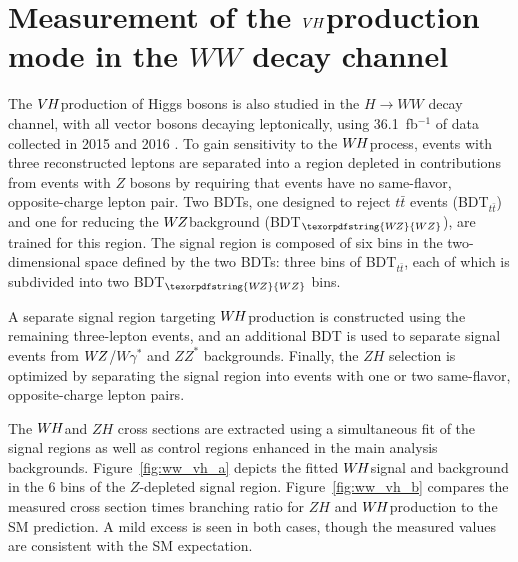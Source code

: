 \documentclass{moriond}
\def\wh{\texorpdfstring{\ensuremath{W\kern -0.1em H}\xspace}{WH\xspace}}
\def\wz{\texorpdfstring{\ensuremath{W\kern -0.1em Z}\xspace}{WZ\xspace}}
\def\vh{\texorpdfstring{\ensuremath{V\kern -0.1em H}\xspace}{VH\xspace}}
\def\zh{\ensuremath{ZH}\xspace}
\def\ttbar{\ensuremath{t\bar{t}}\xspace}
\begin{document}
\section{Measurement of the \vh production mode in the $WW$ decay channel} \label{sec:vh_ww}

The \vh production of Higgs bosons is also studied in the $H{\rightarrow}WW$ decay channel, with all vector bosons
decaying leptonically,
using 36.1~fb$^{-1}$ of data collected in 2015 and 2016 \cite{HIGG-2017-14}.
To gain sensitivity to the \wh process, events with three reconstructed leptons are separated into
a region depleted in contributions from events with $Z$ bosons by requiring that events have no same-flavor, opposite-charge lepton pair.
Two BDTs, one designed to reject
\ttbar events (BDT$_{\ttbar}$) and one for reducing the \wz background (BDT$_{\wz}$), are trained for
this region. The signal region is composed of six bins in the two-dimensional space defined by the two
BDTs: three bins of BDT$_{\ttbar}$, each of which is subdivided into two BDT$_{\wz}$ bins.

A separate signal region targeting \wh production is constructed using the remaining three-lepton
events, and an additional BDT is used to separate signal events from \wz/$W\gamma^*$ and $ZZ^*$
backgrounds. Finally, the \zh selection is optimized by separating the signal region into events with
one or two same-flavor, opposite-charge lepton pairs.

The \wh and \zh cross sections are extracted using a simultaneous fit of the signal regions as well as
control regions enhanced in the main analysis backgrounds.
Figure~\ref{fig:ww_vh_a} depicts the fitted \wh signal and background in the 6 bins of the
$Z$-depleted signal region.
Figure~\ref{fig:ww_vh_b} compares the measured cross section times branching ratio for $ZH$ and \wh production
to the SM prediction. A mild excess is seen in both cases, though the measured values are
consistent with the SM expectation.
\end{document}
